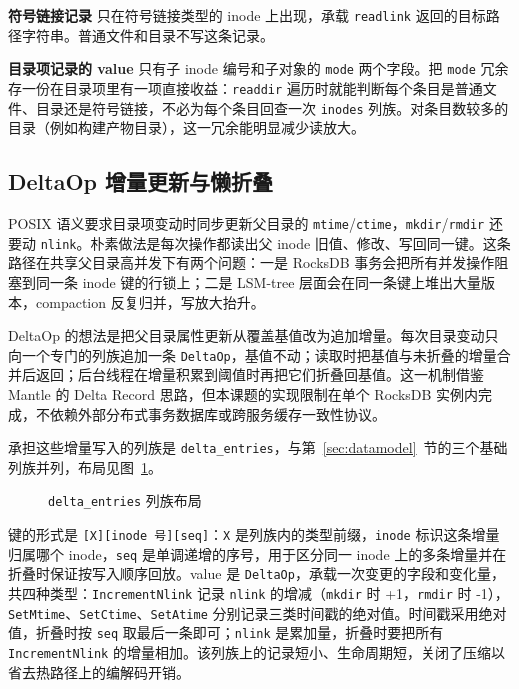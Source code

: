 \textbf{符号链接记录} 只在符号链接类型的 inode 上出现，承载 \texttt{readlink} 返回的目标路径字符串。普通文件和目录不写这条记录。

\textbf{目录项记录的 value} 只有子 inode 编号和子对象的 \texttt{mode} 两个字段。把 \texttt{mode} 冗余存一份在目录项里有一项直接收益：\texttt{readdir} 遍历时就能判断每个条目是普通文件、目录还是符号链接，不必为每个条目回查一次 \texttt{inodes} 列族。对条目数较多的目录（例如构建产物目录），这一冗余能明显减少读放大。

\subsection{DeltaOp 增量更新与懒折叠}
\label{sec:delta_op}

POSIX 语义要求目录项变动时同步更新父目录的 \texttt{mtime}/\texttt{ctime}，\texttt{mkdir}/\texttt{rmdir} 还要动 \texttt{nlink}。朴素做法是每次操作都读出父 inode 旧值、修改、写回同一键。这条路径在共享父目录高并发下有两个问题：一是 RocksDB 事务会把所有并发操作阻塞到同一条 inode 键的行锁上；二是 LSM-tree 层面会在同一条键上堆出大量版本，compaction 反复归并，写放大抬升。

DeltaOp 的想法是把父目录属性更新从覆盖基值改为追加增量。每次目录变动只向一个专门的列族追加一条 \texttt{DeltaOp}，基值不动；读取时把基值与未折叠的增量合并后返回；后台线程在增量积累到阈值时再把它们折叠回基值。这一机制借鉴 Mantle\cite{li2025mantle} 的 Delta Record 思路，但本课题的实现限制在单个 RocksDB 实例内完成，不依赖外部分布式事务数据库或跨服务缓存一致性协议。

承担这些增量写入的列族是 \texttt{delta\_entries}，与第~\ref{sec:datamodel}~节的三个基础列族并列，布局见图~\ref{fig:cf_delta_layout}。

\begin{figure}[htbp]
    \centering
    \caption{\texttt{delta\_entries} 列族布局}
    \label{fig:cf_delta_layout}
\end{figure}

键的形式是 \texttt{[X][inode 号][seq]}：\texttt{X} 是列族内的类型前缀，\texttt{inode} 标识这条增量归属哪个 inode，\texttt{seq} 是单调递增的序号，用于区分同一 inode 上的多条增量并在折叠时保证按写入顺序回放。value 是 \texttt{DeltaOp}，承载一次变更的字段和变化量，共四种类型：\texttt{IncrementNlink} 记录 \texttt{nlink} 的增减（\texttt{mkdir} 时 +1，\texttt{rmdir} 时 -1），\texttt{SetMtime}、\texttt{SetCtime}、\texttt{SetAtime} 分别记录三类时间戳的绝对值。时间戳采用绝对值，折叠时按 \texttt{seq} 取最后一条即可；\texttt{nlink} 是累加量，折叠时要把所有 \texttt{IncrementNlink} 的增量相加。该列族上的记录短小、生命周期短，关闭了压缩以省去热路径上的编解码开销。


